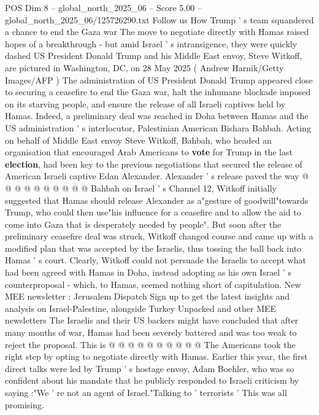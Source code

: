 \begin{textsample}{POS Dim 8 – global\_north\_2025\_06 – Score 5.00 – global\_north\_2025\_06/125726290.txt}  \label{ex:f8_pos_437}
Follow us How Trump ' s team squandered a chance to end the Gaza war The move to negotiate directly with Hamas raised hopes of a breakthrough - but amid Israel ' s intransigence, they were quickly dashed US President Donald Trump and his Middle East envoy, Steve Witkoff, are pictured in Washington, DC, on 28 May 2025 ( Andrew Harnik/Getty Images/AFP ) The administration of US President Donald Trump appeared close to securing a ceasefire to end the Gaza war, halt the inhumane blockade imposed on its starving people, and ensure the release of all Israeli captives held by Hamas.
Indeed, a preliminary deal was reached in Doha between Hamas and the US administration ' s interlocutor, Palestinian American Bishara Bahbah.
Acting on behalf of Middle East envoy Steve Witkoff, Bahbah, who headed an organisation that encouraged Arab Americans to \textbf{vote} for Trump in the last \textbf{election}, had been key to the previous negotiations that secured the release of American Israeli captive Edan Alexander.
Alexander ' s release paved the way @ @ @ @ @ @ @ @ @ @ Bahbah on Israel ' s Channel 12, Witkoff initially suggested that Hamas should release Alexander as a"gesture of goodwill"towards Trump, who could then use"his influence for a ceasefire and to allow the aid to come into Gaza that is desperately needed by people".
But soon after the preliminary ceasefire deal was struck, Witkoff changed course and came up with a modified plan that was accepted by the Israelis, thus tossing the ball back into Hamas ' s court.
Clearly, Witkoff could not persuade the Israelis to accept what had been agreed with Hamas in Doha, instead adopting as his own Israel ' s counterproposal - which, to Hamas, seemed nothing short of capitulation.
New MEE newsletter : Jerusalem Dispatch Sign up to get the latest insights and analysis on Israel-Palestine, alongside Turkey Unpacked and other MEE newsletters The Israelis and their US backers might have concluded that after many months of war, Hamas had been severely battered and was too weak to reject the proposal.
This is @ @ @ @ @ @ @ @ @ @ The Americans took the right step by opting to negotiate directly with Hamas.
Earlier this year, the first direct talks were led by Trump ' s hostage envoy, Adam Boehler, who was so confident about his mandate that he publicly responded to Israeli criticism by saying :"We ' re not an agent of Israel."Talking to ' terrorists ' This was all promising.

\end{textsample}
